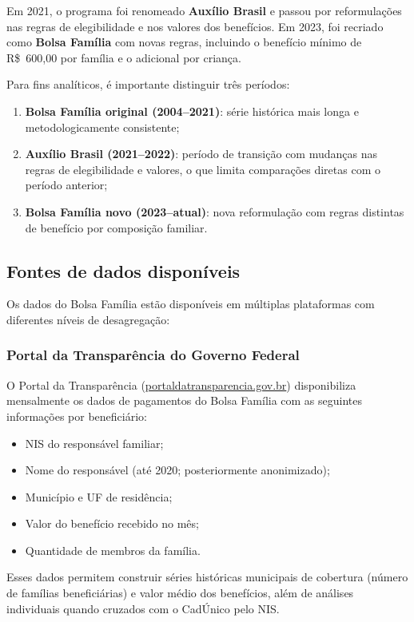 Em 2021, o programa foi renomeado \textbf{Auxílio Brasil} e passou por reformulações nas regras de elegibilidade e nos valores dos benefícios. Em 2023, foi recriado como \textbf{Bolsa Família} com novas regras, incluindo o benefício mínimo de R\$~600,00 por família e o adicional por criança.

Para fins analíticos, é importante distinguir três períodos:

\begin{enumerate}
  \item \textbf{Bolsa Família original (2004--2021)}: série histórica mais longa e metodologicamente consistente;
  \item \textbf{Auxílio Brasil (2021--2022)}: período de transição com mudanças nas regras de elegibilidade e valores, o que limita comparações diretas com o período anterior;
  \item \textbf{Bolsa Família novo (2023--atual)}: nova reformulação com regras distintas de benefício por composição familiar.
\end{enumerate}

\subsection{Fontes de dados disponíveis}

Os dados do Bolsa Família estão disponíveis em múltiplas plataformas com diferentes níveis de desagregação:

\subsubsection{Portal da Transparência do Governo Federal}

O Portal da Transparência (\url{portaldatransparencia.gov.br}) disponibiliza mensalmente os dados de pagamentos do Bolsa Família com as seguintes informações por beneficiário:

\begin{itemize}
  \item NIS do responsável familiar;
  \item Nome do responsável (até 2020; posteriormente anonimizado);
  \item Município e UF de residência;
  \item Valor do benefício recebido no mês;
  \item Quantidade de membros da família.
\end{itemize}

Esses dados permitem construir séries históricas municipais de cobertura (número de famílias beneficiárias) e valor médio dos benefícios, além de análises individuais quando cruzados com o CadÚnico pelo NIS.


